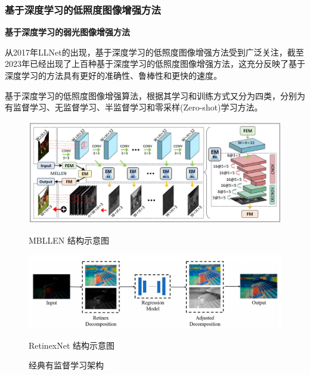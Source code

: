 \documentclass[CJK,aspectratio=169]{beamer}  %
\begin{document}
	\subsubsection{基于深度学习的低照度图像增强方法}
	
	\begin{frame}
		{ \yahei \textbf{基于深度学习的弱光图像增强方法}}
		
		{ \yahei 从2017年LLNet\textcolor{blue}{\citep{lore2017llnet}}的出现，基于深度学习的低照度图像增强方法受到广泛关注，截至2023年已经出现了上百种基于深度学习的低照度图像增强方法，这充分反映了基于深度学习的方法具有更好的准确性、鲁棒性和更快的速度。}
		
		\vspace{0.1cm}
		
		{ \yahei 基于深度学习的低照度图像增强算法，根据其学习和训练方式又分为四类，分别为有监督学习、无监督学习、半监督学习和零采样(Zero-shot)学习方法\textcolor{blue}{\citep{tang2023low}}。}
		
		\vspace{0.1cm}
		
		\begin{figure}
			\centering
			\setlength{\abovecaptionskip}{-0.05cm}			
			\begin{minipage}{.4\columnwidth}
				\setlength{\abovecaptionskip}{-0.05cm}
				\centering 
				\includegraphics[width=\columnwidth]{picture/LLIE/MBLLEN/MBLLEN Architecture}
				\caption{
					\label{fig: MBLLEN} 
					\tiny MBLLEN 结构示意图
				}
			\end{minipage}
			\begin{minipage}{.4\columnwidth}
				\setlength{\abovecaptionskip}{-0.05cm}
				\centering 
				\includegraphics[width=\columnwidth]{picture/LLIE/RetinexNet/RetinexNet}
				\caption{
					\label{fig: RetinexNet} 
					\tiny RetinexNet 结构示意图
				}
			\end{minipage}
			\captionsetup{font=scriptsize}
			\caption{
				\label{fig: Supervised Learning}
				\tiny 经典有监督学习架构
			}
		\end{figure}
		
	\end{frame}
	
\end{document}
